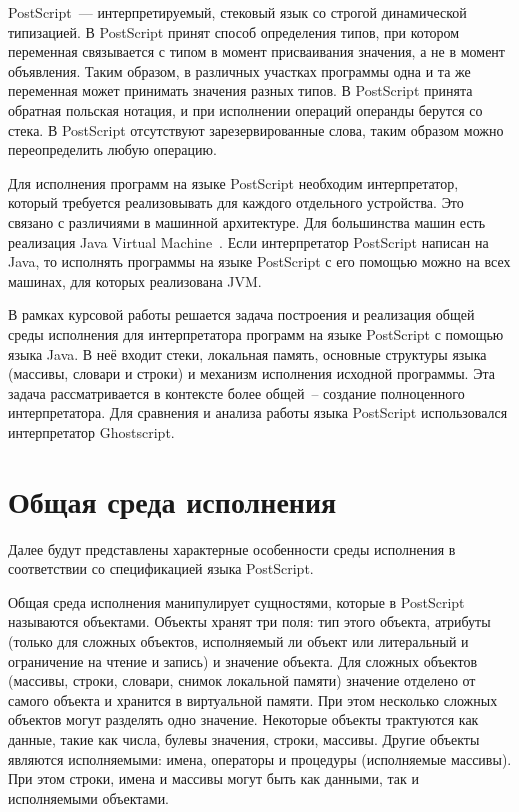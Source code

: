 \documentclass[14pt]{extarticle}
\begin{document}
PostScript~--- интерпретируемый, стековый язык со строгой динамической типизацией. В PostScript принят способ определения типов, при котором переменная связывается с типом в момент присваивания значения, а не в момент объявления. Таким образом, в различных участках программы одна и та же переменная может принимать значения разных типов. В PostScript принята обратная польская нотация, и при исполнении операций операнды берутся со стека. В PostScript отсутствуют зарезервированные слова, таким образом можно переопределить любую операцию. 

Для исполнения программ на языке PostScript необходим интерпретатор, который требуется реализовывать для каждого отдельного устройства. Это связано с различиями в машинной архитектуре. Для большинства машин есть реализация Java Virtual Machine~\cite{jvms}. Если интерпретатор PostScript написан на Java, то исполнять программы на языке PostScript с его помощью можно на всех машинах, для которых реализована JVM.

В рамках курсовой работы решается задача построения и реализация общей среды исполнения для интерпретатора программ на языке PostScript с помощью языка Java. В неё входит стеки, локальная память, основные структуры языка (массивы, словари и строки) и механизм исполнения исходной программы. Эта задача рассматривается в контексте более общей~-- создание полноценного интерпретатора.  Для сравнения и анализа работы языка PostScript использовался интерпретатор Ghostscript.


\pagebreak
\section{Общая среда исполнения}
Далее будут представлены характерные особенности среды исполнения в соответствии со спецификацией языка PostScript\cite{PLRM}.

Общая среда исполнения манипулирует сущностями, которые в PostScript называются  объектами. Объекты хранят три поля: тип этого объекта, атрибуты (только для сложных объектов, исполняемый ли объект или литеральный и ограничение на чтение и запись) и значение объекта. Для сложных объектов (массивы, строки, словари, снимок локальной памяти) значение отделено от самого объекта и хранится в виртуальной памяти. При этом несколько сложных объектов могут разделять одно значение. Некоторые объекты трактуются как данные, такие как числа, булевы значения, строки, массивы. Другие объекты являются исполняемыми: имена, операторы и процедуры (исполняемые массивы). При этом строки, имена и массивы могут быть как данными, так и исполняемыми объектами.
\end{document}
